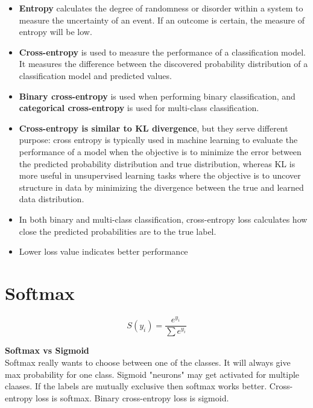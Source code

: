 \documentclass{article}
\begin{document}
\begin{itemize}
    \item \textbf{Entropy} calculates the degree of randomness or disorder within a system to measure the uncertainty of an event. If an outcome is certain, the measure of entropy will be low.
    \item \textbf{Cross-entropy} is used to measure the performance of a classification model.  It measures the difference between the discovered probability distribution of a classification model and predicted values. 
    \item \textbf{Binary cross-entropy} is used when performing binary classification, and \textbf{categorical cross-entropy} is used for multi-class classification.
    \item \textbf{Cross-entropy is similar to KL divergence}, but they serve different purpose: cross entropy is typically used in machine learning to evaluate the performance of a model when the objective is to minimize the error between the predicted probability distribution and true distribution, whereas KL is more useful in unsupervised learning tasks where the objective is to uncover structure in data by minimizing the divergence between the true and learned data distribution. 
    \item In both binary and multi-class classification, cross-entropy loss calculates how close the predicted probabilities are to the true label.
    \item Lower loss value indicates better performance
\end{itemize}
\section{Softmax}
\begin{equation*}
    S(y_i) = \frac{e^{y_i}}{\sum e^{y_i}}
\end{equation*}


\textbf{Softmax vs Sigmoid} \\
Softmax really wants to choose between one of the classes. It will always give max probability for one class. Sigmoid "neurons" may get activated for multiple claases. If the labels are mutually exclusive then softmax works better. Cross-entropy loss is softmax. Binary cross-entropy loss is sigmoid. 
\end{document}
